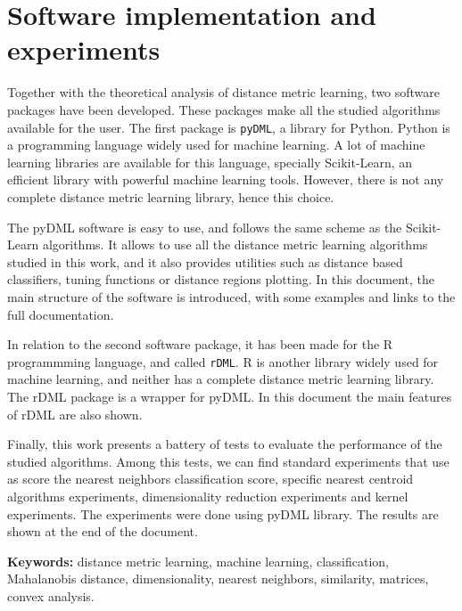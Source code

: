 \section*{Software implementation and experiments}

Together with the theoretical analysis of distance metric learning, two software packages have been developed. These packages make all the studied algorithms available for the user. The first package is \texttt{pyDML}, a library for Python. Python is a programming language widely used for machine learning. A lot of machine learning libraries are available for this language, specially Scikit-Learn, an efficient library with powerful machine learning tools. However, there is not any complete distance metric learning library, hence this choice.

The pyDML software is easy to use, and follows the same scheme as the Scikit-Learn algorithms. It allows to use all the distance metric learning algorithms studied in this work, and it also provides utilities such as distance based classifiers, tuning functions or distance regions plotting. In this document, the main structure of the software is introduced, with some examples and links to the full documentation.

In relation to the second software package, it has been made for the R programmming language, and called \texttt{rDML}. R is another library widely used for machine learning, and neither has a complete distance metric learning library. The rDML package is a wrapper for pyDML. In this document the main features of rDML are also shown.

Finally, this work presents a battery of tests to evaluate the performance of the studied algorithms. Among this tests, we can find standard experiments that use as score the nearest neighbors classification score, specific nearest centroid algorithms experiments, dimensionality reduction experiments and kernel experiments. The experiments were done using pyDML library. The results are shown at the end of the document.


\textbf{Keywords: } distance metric learning, machine learning, classification, Mahalanobis distance, dimensionality, nearest neighbors, similarity, matrices, convex analysis.


